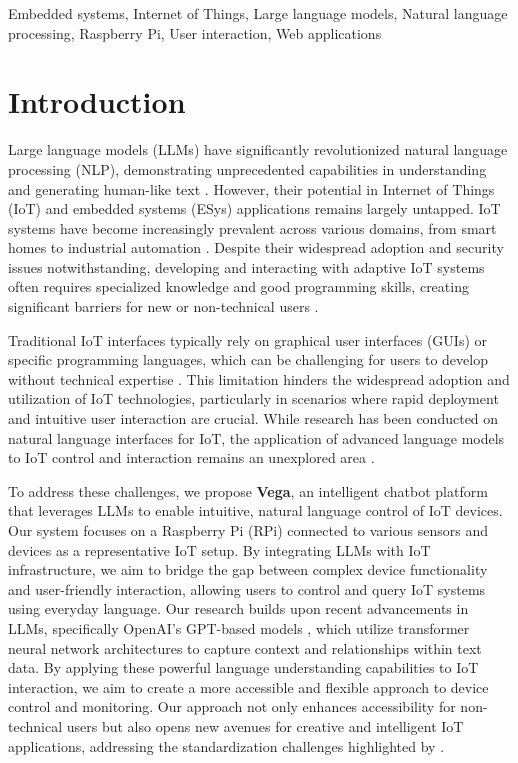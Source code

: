 \documentclass{ieeeaccess}
\begin{document}
\begin{keywords}
    Embedded systems, Internet of Things, Large language models, Natural language processing, Raspberry Pi, User interaction, Web applications
\end{keywords}

\titlepgskip=-21pt

\maketitle

\section{Introduction}\label{sec:introduction}

Large language models (LLMs) have significantly revolutionized natural language processing (NLP), demonstrating unprecedented capabilities in understanding and generating human-like text \cite{10.1145/3641289}. However, their potential in Internet of Things (IoT) and embedded systems (ESys) applications remains largely untapped. IoT systems have become increasingly prevalent across various domains, from smart homes to industrial automation \cite{8355897}. Despite their widespread adoption and security issues notwithstanding, developing and interacting with adaptive IoT systems often requires specialized knowledge and good programming skills, creating significant barriers for new or non-technical users \cite{10.1145/3447526.3472036}.

Traditional IoT interfaces typically rely on graphical user interfaces (GUIs) or specific programming languages, which can be challenging for users to develop without technical expertise \cite{10.1145/3447526.3472036}. This limitation hinders the widespread adoption and utilization of IoT technologies, particularly in scenarios where rapid deployment and intuitive user interaction are crucial. While research has been conducted on natural language interfaces for IoT, the application of advanced language models to IoT control and interaction remains an unexplored area \cite{KASSAB2020102663}.

To address these challenges, we propose \textbf{Vega}, an intelligent chatbot platform that leverages LLMs to enable intuitive, natural language control of IoT devices. Our system focuses on a Raspberry Pi (RPi) connected to various sensors and devices as a representative IoT setup. By integrating LLMs with IoT infrastructure, we aim to bridge the gap between complex device functionality and user-friendly interaction, allowing users to control and query IoT systems using everyday language. Our research builds upon recent advancements in LLMs, specifically OpenAI's GPT-based models \cite{OpenAI_GPT}, which utilize transformer neural network architectures to capture context and relationships within text data. By applying these powerful language understanding capabilities to IoT interaction, we aim to create a more accessible and flexible approach to device control and monitoring. Our approach not only enhances accessibility for non-technical users but also opens new avenues for creative and intelligent IoT applications, addressing the standardization challenges highlighted by \citet{7821686}.
\end{document}
